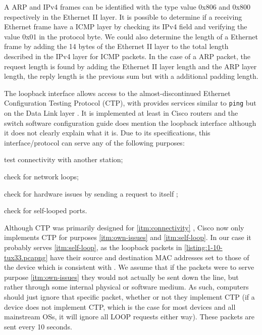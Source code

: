 \documentclass[a4paper, 11pt]{report}
\begin{document}
A ARP and IPv4 frames can be identified with the type value 0x806 and 0x800 respectively in the Ethernet II layer.
It is possible to determine if a receiving Ethernet frame have a ICMP layer by checking its IPv4 field and verifying the value 0x01 in the protocol byte.
We could also determine the length of a Ethernet frame by adding the 14 bytes of the Ethernet II layer to the total length described in the IPv4 layer for ICMP packets.
In the case of a ARP packet, the request length is found by adding the Ethernet II layer length and the ARP layer length, the reply length is the previous sum but with a additional padding length. 

The loopback interface allows access to the almost-discontinued Ethernet Configuration Testing Protocol (CTP)\cite{how-ethernet-keepalive-works}\cite[ch.~8]{ethernet}, with provides services similar to \texttt{ping} but on the Data Link layer \cite{jhawk}. It is implemented at least in Cisco routers \cite{jhawk}\cite{whats-a-loop-traffic-in-ethereal} and the switch software configuration guide \cite{cisco-switch-manual} does mention the loopback interface although it does not clearly explain what it is. Due to its specifications, this interface/protocol can serve any of the following purposes:
\begin{enumerate*}[label=(\arabic*)]
    \item \label{itm:connectivity} test connectivity with another station;
    \item \label{itm:loops} check for network loops;
    \item \label{itm:own-issues} check for hardware issues by sending a request to itself \cite{whats-a-loop-traffic-in-ethereal};
    \item \label{itm:self-loop} check for self-looped ports.
\end{enumerate*}
Although CTP was primarily designed for \ref{itm:connectivity} \cite[sec.~8.1]{ethernet}, Cisco now only implements CTP for purposes \ref{itm:own-issues} and \ref{itm:self-loop}\cite{whats-a-loop-traffic-in-ethereal}. In our case it probably serves \ref{itm:self-loop}, as the loopback packets in \ref{listing:1-10-tux33.pcapng} have their source and destination MAC addresses set to those of the device which is consistent with \cite{whats-a-loop-traffic-in-ethereal}. We assume that if the packets were to serve purpose \ref{itm:own-issues} they would not actually be sent down the line, but rather through some internal physical or software medium. As such, computers should just ignore that specific packet, whether or not they implement CTP (if a device does not implement CTP, which is the case for most devices and all mainstream OSs, it will ignore all LOOP requests either way). These packets are sent every 10 seconds.
\end{document}
